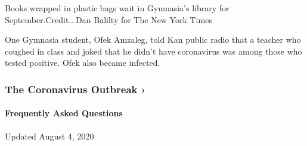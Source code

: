 Books wrapped in plastic bags wait in Gymnasia's library for
September.Credit...Dan Balilty for The New York Times

One Gymnasia student, Ofek Amzaleg, told Kan public radio that a teacher
who coughed in class and joked that he didn't have coronavirus was among
those who tested positive. Ofek also became infected.

\href{https://www.nytimes3xbfgragh.onion/news-event/coronavirus?action=click\&pgtype=Article\&state=default\&region=MAIN_CONTENT_3\&context=storylines_faq}{}

\hypertarget{the-coronavirus-outbreak-}{%
\subsubsection{The Coronavirus Outbreak
›}\label{the-coronavirus-outbreak-}}

\hypertarget{frequently-asked-questions}{%
\paragraph{Frequently Asked
Questions}\label{frequently-asked-questions}}

Updated August 4, 2020


